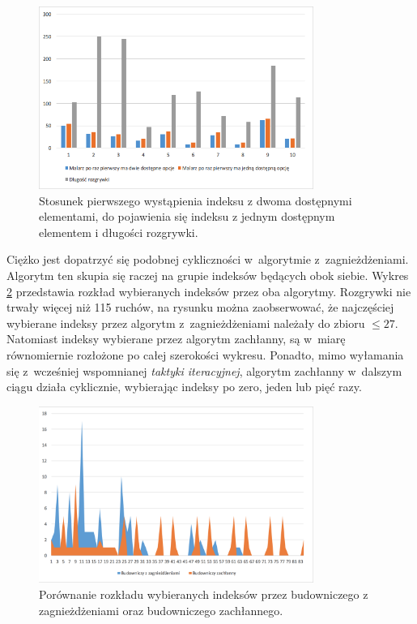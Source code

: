 \documentclass[document]{xmgr}
\begin{document}
\begin{figure}[tbh]
    \centering
    \includegraphics[width = 0.8\textwidth]{images/builder0efficiency}
    \caption{Stosunek pierwszego wystąpienia indeksu z dwoma dostępnymi elementami, do pojawienia się indeksu z jednym dostępnym elementem i długości rozgrywki.}
    \label{fig:builder0Efficiency}
\end{figure}

Ciężko jest dopatrzyć się podobnej cykliczności w~algorytmie z~zagnieżdżeniami. Algorytm ten skupia się raczej na grupie indeksów będących obok siebie. Wykres \ref{fig:buildersPickedIndexes} przedstawia rozkład wybieranych indeksów przez oba algorytmy. Rozgrywki nie trwały więcej niż 115 ruchów, na rysunku można zaobserwować, że najczęściej wybierane indeksy przez algorytm z~zagnieżdżeniami należały do zbioru $\leq 27$. Natomiast indeksy wybierane przez algorytm zachłanny, są w~miarę równomiernie rozłożone po całej szerokości wykresu. Ponadto, mimo wyłamania się z~wcześniej wspomnianej \emph{taktyki iteracyjnej}, algorytm zachłanny w~dalszym ciągu działa cyklicznie, wybierając indeksy po zero, jeden lub pięć razy.

\begin{figure}[tbh]
    \centering
    \includegraphics[width = 0.8\textwidth]{images/buildersPickedIndexes}
    \caption{Porównanie rozkładu wybieranych indeksów przez budowniczego z zagnieżdżeniami oraz budowniczego zachłannego.}
    \label{fig:buildersPickedIndexes}
\end{figure}
\end{document}
